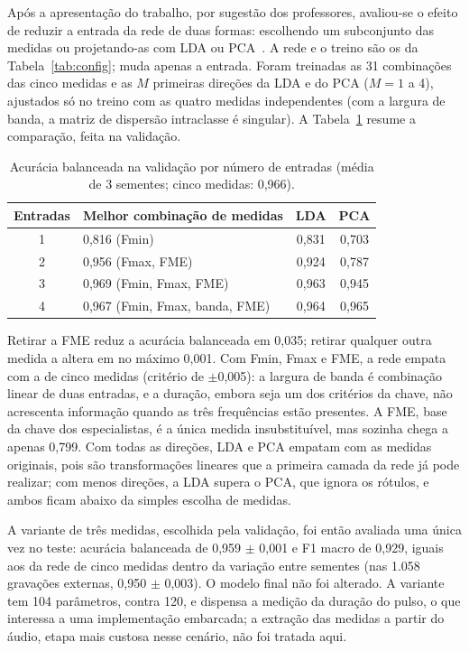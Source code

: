 \documentclass{sbrt}
\begin{document}
Após a apresentação do trabalho, por sugestão dos professores, avaliou-se o efeito de reduzir a entrada da rede de duas formas: escolhendo um subconjunto das medidas ou projetando-as com LDA ou PCA~\cite{psi0325}. A rede e o treino são os da Tabela~\ref{tab:config}; muda apenas a entrada. Foram treinadas as 31 combinações das cinco medidas e as $M$ primeiras direções da LDA e do PCA ($M=1$ a 4), ajustados só no treino com as quatro medidas independentes (com a largura de banda, a matriz de dispersão intraclasse é singular). A Tabela~\ref{tab:entradas} resume a comparação, feita na validação.

\begin{table}[htb]
\caption{\label{tab:entradas}Acurácia balanceada na validação por número de entradas (média de 3 sementes; cinco medidas: 0,966).}
\begin{center}
\begin{tabular}{clcc}\hline
Entradas & Melhor combinação de medidas & LDA & PCA\\\hline
1 & 0,816 (Fmin) & 0,831 & 0,703\\
2 & 0,956 (Fmax, FME) & 0,924 & 0,787\\
3 & 0,969 (Fmin, Fmax, FME) & 0,963 & 0,945\\
4 & 0,967 (Fmin, Fmax, banda, FME) & 0,964 & 0,965\\\hline
\end{tabular}
\end{center}
\end{table}

Retirar a FME reduz a acurácia balanceada em 0,035; retirar qualquer outra medida a altera em no máximo 0,001. Com Fmin, Fmax e FME, a rede empata com a de cinco medidas (critério de $\pm$0,005): a largura de banda é combinação linear de duas entradas, e a duração, embora seja um dos critérios da chave, não acrescenta informação quando as três frequências estão presentes. A FME, base da chave dos especialistas, é a única medida insubstituível, mas sozinha chega a apenas 0,799. Com todas as direções, LDA e PCA empatam com as medidas originais, pois são transformações lineares que a primeira camada da rede já pode realizar; com menos direções, a LDA supera o PCA, que ignora os rótulos, e ambos ficam abaixo da simples escolha de medidas.

A variante de três medidas, escolhida pela validação, foi então avaliada uma única vez no teste: acurácia balanceada de 0,959 $\pm$ 0,001 e F1 macro de 0,929, iguais aos da rede de cinco medidas dentro da variação entre sementes (nas 1.058 gravações externas, 0,950 $\pm$ 0,003). O modelo final não foi alterado. A variante tem 104 parâmetros, contra 120, e dispensa a medição da duração do pulso, o que interessa a uma implementação embarcada; a extração das medidas a partir do áudio, etapa mais custosa nesse cenário, não foi tratada aqui.
\end{document}
